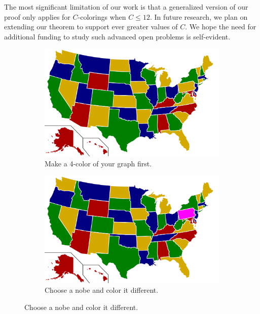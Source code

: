\documentclass{article}
\begin{document}
The most significant limitation of our work is that a generalized version of our proof only applies for $C$-colorings when $C \le 12$. In future research, we plan on extending our theorem to support ever greater values of $C$. We hope the need for additional funding to study such advanced open problems is self-evident.

\newpage

\thispagestyle{empty}

\begin{figure}
	\centering
	\begin{subfigure}[b]{0.45\textwidth}
	\includegraphics[width=\textwidth]{4color.pdf}
	\caption{Make a 4-color of your graph first. \\ {}}
	\end{subfigure}
	\quad
	\begin{subfigure}[b]{0.45\textwidth}
	\includegraphics[width=\textwidth]{5color.pdf}
	\caption{Choose a nobe and color it different.}
	\end{subfigure}


\end{figure}
\end{document}
